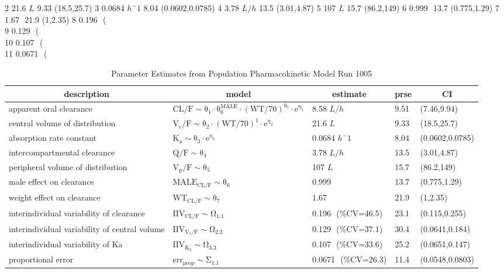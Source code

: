 \begin{Schunk}
\begin{Soutput}
2                21.6 $ L $ 9.33     (18.5,25.7)
3          0.0684 $ h^-1  $ 8.04 (0.0602,0.0785)
4              3.78 $ L/h $ 13.5     (3.01,4.87)
5                 107 $ L $ 15.7      (86.2,149)
6                0.999 $  $ 13.7    (0.775,1.29)
7                 1.67 $  $ 21.9        (1,2.35)
8   0.196 $  $ (\\%CV=46.5) 23.1   (0.115,0.255)
9   0.129 $  $ (\\%CV=37.1) 30.4  (0.0641,0.184)
10  0.107 $  $ (\\%CV=33.6) 25.2  (0.0651,0.147)
11 0.0671 $  $ (\\%CV=26.3) 11.4 (0.0548,0.0803)
\end{Soutput}
\end{Schunk}
%
\begin{table}[ht]
 \caption[Model 1005 Parameters]{Parameter Estimates from Population Pharmacokinetic Model Run 1005\label{p1005}} 
 \begin{center}
 \begin{tabular}{lllll}\hline\hline
\multicolumn{1}{c}{description}&\multicolumn{1}{c}{model}&\multicolumn{1}{c}{estimate}&\multicolumn{1}{c}{prse}&\multicolumn{1}{c}{CI}\tabularnewline
\hline
apparent oral clearance&$\mathrm{CL/F  \sim \theta_{1}\cdot  \theta_{6}^{MALE}\cdot (WT/70)^{\theta_{7}}\cdot e^{\eta_{1}}}$&8.58 $ L/h $&9.51&(7.46,9.94)\tabularnewline
central volume of distribution&$\mathrm{V_{c}/F  \sim \theta_{2}\cdot (WT/70)^{1}\cdot e^{\eta_{2}}}$&21.6 $ L $&9.33&(18.5,25.7)\tabularnewline
absorption rate constant&$\mathrm{K_{a} \sim \theta_{3}\cdot e^{\eta_{3}}}$&0.0684 $ h^-1  $&8.04&(0.0602,0.0785)\tabularnewline
intercompartmental clearance&$\mathrm{Q/F  \sim \theta_{4}}$&3.78 $ L/h $&13.5&(3.01,4.87)\tabularnewline
peripheral volume of distribution&$\mathrm{V_{p}/F  \sim \theta_{5}}$&107 $ L $&15.7&(86.2,149)\tabularnewline
male effect on clearance&$\mathrm{MALE_{CL/F}\sim \theta_{6}}$&0.999 $  $&13.7&(0.775,1.29)\tabularnewline
weight effect on clearance&$\mathrm{WT_{CL/F}\sim \theta_{7}}$&1.67 $  $&21.9&(1,2.35)\tabularnewline
interindividual variability of clearance&$\mathrm{IIV_{CL/F}\sim \Omega_{1.1}}$&0.196 $  $ (\%CV=46.5)&23.1&(0.115,0.255)\tabularnewline
interindividual variability of central volume&$\mathrm{IIV_{V_{c}/F}\sim \Omega_{2.2}}$&0.129 $  $ (\%CV=37.1)&30.4&(0.0641,0.184)\tabularnewline
interindividual variability of Ka&$\mathrm{IIV_{K_{a}}\sim \Omega_{3.3}}$&0.107 $  $ (\%CV=33.6)&25.2&(0.0651,0.147)\tabularnewline
proportional error&$\mathrm{err_{prop}\sim \Sigma_{1.1}}$&0.0671 $  $ (\%CV=26.3)&11.4&(0.0548,0.0803)\tabularnewline
\hline
\end{tabular}

\end{center}

\end{table}
